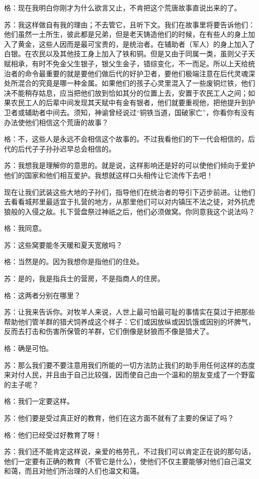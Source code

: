 \documentclass[12pt,oneside]{book}
\begin{document}
格：现在我明白你刚才为什么欲言又止，不肯把这个荒唐故事直说出来的了。

苏：我这样做自有我的理由；不去管它，且听下文。我们在故事里将要告诉他们：他们虽然一土所生，彼此都是兄弟，但是老天铸造他们的时候，在有些人的身上加入了黄金，这些人因而是最可宝贵的，是统治者。在辅助者（军人）的身上加入了白银。在农民以及其他技工身上加入了铁和铜。但是又由于同属一类，虽则父子天赋相承，有时不免金父生银子，银父生金子，错综变化，不一而足。所以上天给统治者的命令最重要的就是要他们做后代的好护卫者，要他们极端注意在后代灵魂深处所混合的究竟是哪一种金属。如果他们的孩子心灵里混入了一些废铜烂铁，他们决不能稍存姑息，应当把他们放到恰如其分的位置上去，安置于农民工人之间；如果农民工人的后辈中间发现其天赋中有金有银者，他们就要重视他，把他提升到护卫者或辅助者中间去。须知，神谕曾经说过“铜铁当道，国破家亡”，你看你有没有办法使他们相信这个荒唐的故事？

格：不，这些人是永远不会相信这个故事的。不过我看他们的下一代会相信的，后代的后代子子孙孙迟早总会相信的。

苏：我想我是理解你的意思的。就是说，这样影响还是好的可以使他们倾向于爱护他们的国家和他们相互爱护。我想就这样口头相传让它流传下去吧！

现在让我们武装这些大地的子孙们，指导他们在统治者的导引下迈步前进。让他们去看看城邦里最适宜于扎营的地方，从那里他们可以对内镇压不法之徒，对外抗虎狼般的入侵之敌。扎下营盘祭过神祇之后，他们必须做窝。你同意我这个说法吗？

格：我同意。

苏：这些窝要能冬天暖和夏天宽敞吗？

格：当然是的。因为我想你是指他们的住处。

苏：是的，我是指兵士的营房，不是指商人的住房。

格：这两者分别在哪里？

苏：让我来告诉你。对牧羊人来说，人世上最可怕最可耻的事情实在莫过于把那些帮助他们管羊群的猎犬饲养成这个样子：它们或因放纵或因饥饿或因别的坏脾气，反而去打击和伤害所保管的羊群，它们倒像是豺狼而不像是猎犬了。

格：确是可怕。

苏：那么我们要不要注意用我们所能的一切方法防止我们的助手用任何这样的态度来对付人民，并且由于自己比较强，因而使自己由一个温和的朋友变成了一个野蛮的主子呢？

格：我们一定要这样。

苏：他们要是受过真正好的教育，他们在这方面不就有了主要的保证了吗？

格：他们已经受过好教育了呀！

苏：我们还不能肯定这样说，亲爱的格劳孔，不过我们可以肯定正在说的那句话，他们一定要有正确的教育（不管它是什么），使他们不仅主要能够对他们自己温文和蔼，而且对他们所治理的人们也温文和蔼。
\end{document}
